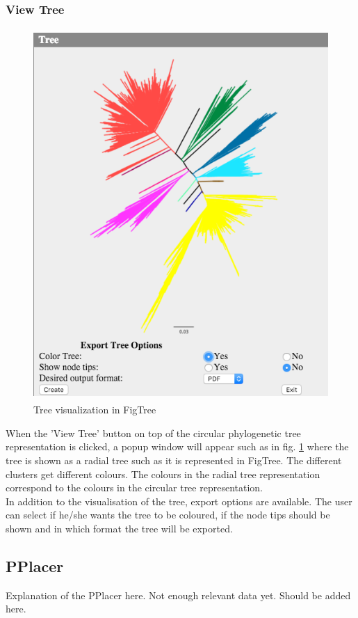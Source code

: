 \documentclass[a4paper, 11pt]{article} %
\begin{document}
\subsubsection{View Tree}
\begin{figure}[H]
\centering
\includegraphics[width=400pt, height=400pt, keepaspectratio=true]{images/view_tree.PNG}
\caption{Tree visualization in FigTree}
\label{fig:view_tree}
\end{figure}
When the 'View Tree' button on top of the circular phylogenetic tree representation is clicked, a popup window will appear such as in fig. \ref{fig:view_tree} where the tree is shown as a radial tree such as it is represented in FigTree. The different clusters get different colours. The colours in the radial tree representation correspond to the colours in the circular tree representation.
\\
In addition to the visualisation of the tree, export options are available. The user can select if he/she wants the tree to be coloured, if the node tips should be shown and in which format the tree will be exported. 

\subsection{PPlacer}
Explanation of the PPlacer here. Not enough relevant data yet. Should be added here. \citep{Matsen2010}
\end{document}
